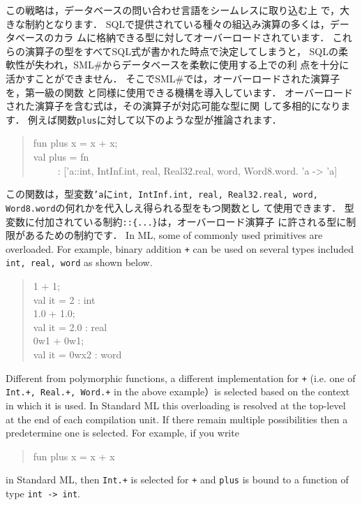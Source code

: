\documentclass{jbook}
\newcommand{\smlsharp}{SML\#}
\newcommand{\myem}{\ \ \ \ \  }
\begin{document}
	この戦略は，データベースの問い合わせ言語をシームレスに取り込む上
で，大きな制約となります．
	SQLで提供されている種々の組込み演算の多くは，データベースのカラ
ムに格納できる型に対してオーバーロードされています．
	これらの演算子の型をすべてSQL式が書かれた時点で決定してしまうと，
SQLの柔軟性が失われ，\smlsharp{}からデータベースを柔軟に使用する上での利
点を十分に活かすことができません．
	そこで\smlsharp{}では，オーバーロードされた演算子を，第一級の関数
と同様に使用できる機構を導入しています．
	オーバーロードされた演算子を含む式は，その演算子が対応可能な型に関
して多相的になります．
	例えば関数{\tt plus}に対して以下のような型が推論されます．
\begin{quote}
fun plus x = x + x;\\
val plus = fn\\
\myem  : ['a::{int, IntInf.int, real, Real32.real, word, Word8.word}. 'a -> 'a]
\end{quote}
	この関数は，型変数{\tt 'a}に{\tt int, IntInf.int, real,
Real32.real, word, Word8.word}の何れかを代入しえ得られる型をもつ関数とし
て使用できます．
	型変数に付加されている制約{\tt ::\{...\}}は，オーバーロード演算子
に許される型に制限があるための制約です．
\else%
	In ML, some of commonly used primitives are overloaded.
	For example, binary addition {\tt +} can be used on several
types included {\tt int, real, word} as shown below.
\begin{quote}
1 + 1;\\
val it = 2 : int\\
1.0 + 1.0;\\
val it = 2.0 : real\\
0w1 + 0w1;\\
val it = 0wx2 : word
\end{quote}
	Different from polymorphic functions, a different implementation
for {\tt +} (i.e. one of {\tt Int.+, Real.+, Word.+} in the above
example）is selected based on the context in which it is used. 
	In Standard ML this overloading is resolved at the top-level
at the end of each compilation unit.
	If there remain multiple possibilities then a predetermine one
is selected.
	For example, if you write 
\begin{quote}
fun plus x = x + x
\end{quote}
in Standard ML, then {\tt Int.+}  is selected for {\tt +} and {\tt plus}
is bound to a function of type {\tt int -> int}.
	
\end{document}
